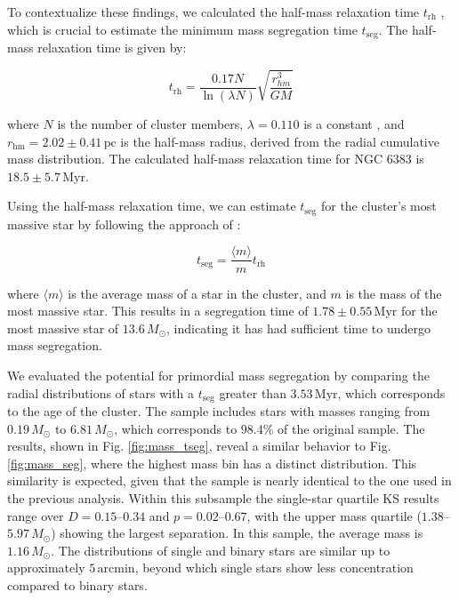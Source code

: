 \documentclass{aa}
\begin{document}
To contextualize these findings, we calculated the half-mass relaxation time $t_{\mathrm{rh}}$ \citep{1969ApJ...158L.139S}, which is crucial to estimate the minimum mass segregation time $t_{\mathrm{seg}}$. The half-mass relaxation time is given by:

\begin{equation}
t_{\mathrm{rh}} = \frac{0.17N}{\ln(\lambda N)}\sqrt{\frac{r_{hm}^3}{GM}}
\end{equation}

where $N$ is the number of cluster members, $\lambda = 0.110$ is a constant \citep{1994MNRAS.268..257G}, and $r_\mathrm{hm} = 2.02 \pm 0.41\,\mathrm{pc}$ is the half-mass radius, derived from the radial cumulative mass distribution. The calculated half-mass relaxation time for NGC 6383 is $18.5\pm 5.7\,\mathrm{Myr}$.

Using the half-mass relaxation time, we can estimate $t_{\mathrm{seg}}$ for the cluster's most massive star by following the approach of \citet{1969ApJ...158L.139S}:

\begin{equation}
t_{\mathrm{seg}} = \frac{\langle m \rangle}{m} t_{\mathrm{rh}}
\end{equation}

where $\langle m \rangle$ is the average mass of a star in the cluster, and $m$ is the mass of the most massive star. This results in a segregation time of $1.78 \pm 0.55\,\mathrm{Myr}$ for the most massive star of $13.6\,M_\odot$, indicating it has had sufficient time to undergo mass segregation.

We evaluated the potential for primordial mass segregation by comparing the radial distributions of stars with a $t_{\mathrm{seg}}$ greater than $3.53\,\mathrm{Myr}$, which corresponds to the age of the cluster. The sample includes stars with masses ranging from $0.19\,M_\odot$ to $6.81\,M_\odot$, which corresponds to $98.4$\% of the original sample. The results, shown in Fig. \ref{fig:mass_tseg}, reveal a similar behavior to Fig. \ref{fig:mass_seg}, where the highest mass bin has a distinct distribution. This similarity is expected, given that the sample is nearly identical to the one used in the previous analysis. Within this subsample the single-star quartile KS results range over $D=0.15$--$0.34$ and $p=0.02$--$0.67$, with the upper mass quartile ($1.38$--$5.97\,M_\odot$) showing the largest separation. In this sample, the average mass is $1.16\,M_\odot$. The distributions of single and binary stars are similar up to approximately $5\,\mathrm{arcmin}$, beyond which single stars show less concentration compared to binary stars.
\end{document}
